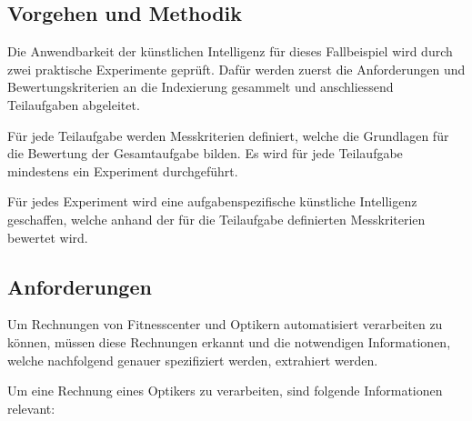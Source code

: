 


\subsection{Vorgehen und Methodik}


Die Anwendbarkeit der künstlichen Intelligenz für dieses Fallbeispiel wird durch zwei praktische Experimente geprüft. Dafür werden zuerst die Anforderungen und Bewertungskriterien an die Indexierung gesammelt und anschliessend Teilaufgaben abgeleitet. 

Für jede Teilaufgabe werden Messkriterien definiert, welche die Grundlagen für die Bewertung der Gesamtaufgabe bilden. Es wird für jede Teilaufgabe mindestens ein Experiment durchgeführt.

Für jedes Experiment wird eine aufgabenspezifische künstliche Intelligenz geschaffen, welche anhand der für die Teilaufgabe definierten Messkriterien bewertet wird.

\subsection{Anforderungen}

Um Rechnungen von Fitnesscenter und Optikern automatisiert verarbeiten zu können, müssen diese Rechnungen erkannt und die notwendigen Informationen, welche nachfolgend genauer spezifiziert werden, extrahiert werden.

Um eine Rechnung eines Optikers zu verarbeiten, sind folgende Informationen relevant:

